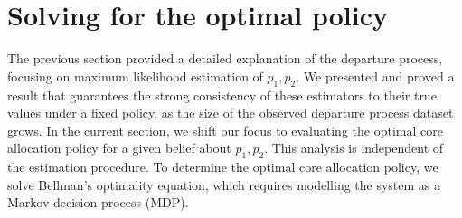 \documentclass[11pt]{article}
\newcommand{\jp}[1]{\footnote{J-P: #1}}
\theoremstyle{remark}
\theoremstyle{definition}
\numberwithin{equation}{section}
\begin{document}






\section{Solving for the optimal policy} \label{section: optimal policy}


The previous section provided a detailed explanation of the departure process, focusing on maximum likelihood estimation of $p_1, p_2$. 
We presented and proved a result that guarantees the strong consistency of these estimators to their true values under a fixed policy, as the size of the observed departure process dataset grows. 
In the current section, we shift our focus to evaluating the optimal core allocation policy for a given belief about $p_1, p_2$. 
This analysis is independent of the estimation procedure.
To determine the optimal core allocation policy, we solve Bellman's optimality equation, which requires modelling the system as a {Markov decision process (MDP)}.
\end{document}
